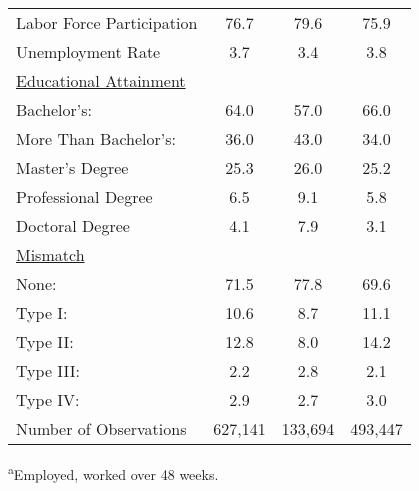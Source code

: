 \documentclass[11pt]{article}
\theoremstyle{definition}
\begin{document}
{\begin{center}
\begin{tabular}{l c c c}
Labor Force Participation & 76.7 & 79.6 & 75.9 \\
Unemployment Rate & 3.7 & 3.4 & 3.8 \\
\underline{Educational Attainment}  &  &  & \\
Bachelor's:  & 64.0 & 57.0 & 66.0 \\
More Than Bachelor's:  & 36.0 & 43.0 & 34.0 \\
\hspace{2.5mm}Master's Degree & 25.3 & 26.0 & 25.2 \\
\hspace{2.5mm}Professional Degree & 6.5 & 9.1 & 5.8 \\
\hspace{2.5mm}Doctoral Degree & 4.1 & 7.9 & 3.1 \\
\underline{Mismatch}  &  &  & \\
None:  & 71.5 & 77.8 & 69.6 \\
Type I:  & 10.6 & 8.7 & 11.1 \\
Type II:  & 12.8 & 8.0 & 14.2 \\
Type III:  & 2.2 & 2.8 & 2.1 \\
Type IV:  & 2.9 & 2.7 & 3.0 \\
\hline
Number of Observations & 627,141 & 133,694 & 493,447 \\
\hline\hline
\end{tabular} 
\end{center}} 
\small{\textsuperscript{a}Employed, worked over 48 weeks.}
\end{document}
